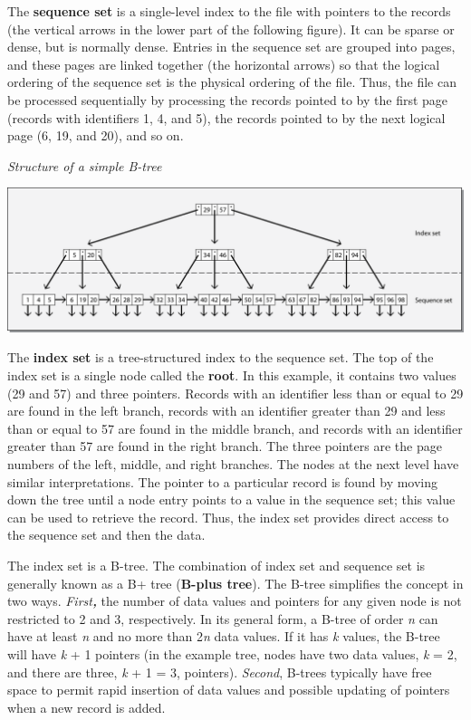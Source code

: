 \documentclass[
]{article}
\begin{document}
The \textbf{sequence set} is a single-level index to the file with pointers
to the records (the vertical arrows in the lower part of the following
figure). It can be sparse or dense, but is normally dense. Entries in
the sequence set are grouped into pages, and these pages are linked
together (the horizontal arrows) so that the logical ordering of the
sequence set is the physical ordering of the file. Thus, the file can be
processed sequentially by processing the records pointed to by the first
page (records with identifiers 1, 4, and 5), the records pointed to by
the next logical page (6, 19, and 20), and so on.

\emph{Structure of a simple B-tree}

\includegraphics{Figures/Chapter 20/b-tree.png}

The \textbf{index set} is a tree-structured index to the sequence set. The
top of the index set is a single node called the \textbf{root}. In this
example, it contains two values (29 and 57) and three pointers. Records
with an identifier less than or equal to 29 are found in the left
branch, records with an identifier greater than 29 and less than or
equal to 57 are found in the middle branch, and records with an
identifier greater than 57 are found in the right branch. The three
pointers are the page numbers of the left, middle, and right branches.
The nodes at the next level have similar interpretations. The pointer to
a particular record is found by moving down the tree until a node entry
points to a value in the sequence set; this value can be used to
retrieve the record. Thus, the index set provides direct access to the
sequence set and then the data.

The index set is a B-tree. The combination of index set and sequence set
is generally known as a B+ tree (\textbf{B-plus tree}). The B-tree simplifies
the concept in two ways. \emph{First\textbf{,}} the number of data values and
pointers for any given node is not restricted to 2 and 3, respectively.
In its general form, a B-tree of order \emph{n} can have at least \emph{n} and no
more than 2\emph{n} data values. If it has \emph{k} values, the B-tree will have
\emph{k} + 1 pointers (in the example tree, nodes have two data values, \emph{k} =
2, and there are three, \emph{k} + 1 = 3, pointers). \emph{Second}, B-trees
typically have free space to permit rapid insertion of data values and
possible updating of pointers when a new record is added.
\end{document}
